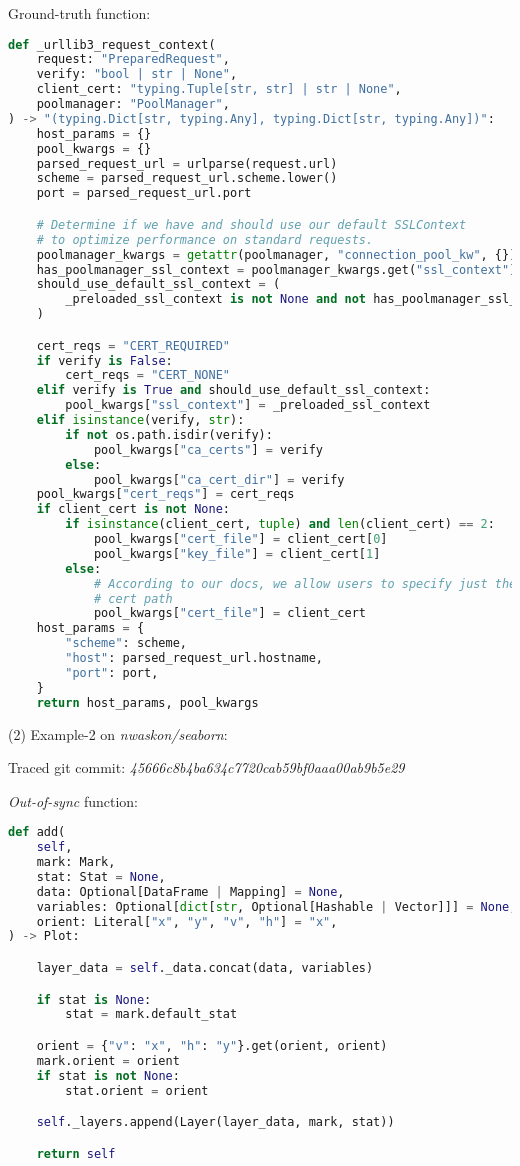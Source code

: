 Ground-truth function:
\begin{lstlisting}[language=Python]
def _urllib3_request_context(
    request: "PreparedRequest",
    verify: "bool | str | None",
    client_cert: "typing.Tuple[str, str] | str | None",
    poolmanager: "PoolManager",
) -> "(typing.Dict[str, typing.Any], typing.Dict[str, typing.Any])":
    host_params = {}
    pool_kwargs = {}
    parsed_request_url = urlparse(request.url)
    scheme = parsed_request_url.scheme.lower()
    port = parsed_request_url.port

    # Determine if we have and should use our default SSLContext
    # to optimize performance on standard requests.
    poolmanager_kwargs = getattr(poolmanager, "connection_pool_kw", {})
    has_poolmanager_ssl_context = poolmanager_kwargs.get("ssl_context")
    should_use_default_ssl_context = (
        _preloaded_ssl_context is not None and not has_poolmanager_ssl_context
    )

    cert_reqs = "CERT_REQUIRED"
    if verify is False:
        cert_reqs = "CERT_NONE"
    elif verify is True and should_use_default_ssl_context:
        pool_kwargs["ssl_context"] = _preloaded_ssl_context
    elif isinstance(verify, str):
        if not os.path.isdir(verify):
            pool_kwargs["ca_certs"] = verify
        else:
            pool_kwargs["ca_cert_dir"] = verify
    pool_kwargs["cert_reqs"] = cert_reqs
    if client_cert is not None:
        if isinstance(client_cert, tuple) and len(client_cert) == 2:
            pool_kwargs["cert_file"] = client_cert[0]
            pool_kwargs["key_file"] = client_cert[1]
        else:
            # According to our docs, we allow users to specify just the client
            # cert path
            pool_kwargs["cert_file"] = client_cert
    host_params = {
        "scheme": scheme,
        "host": parsed_request_url.hostname,
        "port": port,
    }
    return host_params, pool_kwargs
\end{lstlisting}



(2) Example-2 on \textit{nwaskon/seaborn}:

Traced git commit: \textit{45666c8b4ba634c7720cab59bf0aaa00ab9b5e29}

\textit{Out-of-sync} function:
\begin{lstlisting}[language=Python]
def add(
    self,
    mark: Mark,
    stat: Stat = None,
    data: Optional[DataFrame | Mapping] = None,
    variables: Optional[dict[str, Optional[Hashable | Vector]]] = None,
    orient: Literal["x", "y", "v", "h"] = "x",
) -> Plot:

    layer_data = self._data.concat(data, variables)

    if stat is None:
        stat = mark.default_stat

    orient = {"v": "x", "h": "y"}.get(orient, orient)
    mark.orient = orient
    if stat is not None:
        stat.orient = orient

    self._layers.append(Layer(layer_data, mark, stat))

    return self
\end{lstlisting}


